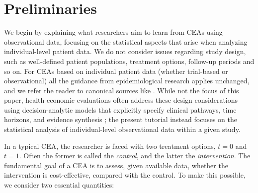 \documentclass[aoas,preprint]{imsart}
\theoremstyle{plain}
\theoremstyle{definition}
\theoremstyle{remark}
\theoremstyle{remark}
\begin{document}
\section{Preliminaries}\label{sec:preliminaries}

We begin by explaining what researchers aim to learn from CEAs using observational data, focusing on the statistical aspects that arise when analyzing individual-level patient data. We do not consider issues regarding study design, such as well-defined patient populations, treatment options, follow-up periods and so on. For CEAs based on individual patient data (whether trial-based or observational) all the guidance from epidemiological research applies unchanged, and we refer the reader to canonical sources like \citet{hernan2016using}. While not the focus of this paper, health economic evaluations often address these design considerations using decision-analytic models that explicitly specify clinical pathways, time horizons, and evidence synthesis \citep{Sculpher2006}; the present tutorial instead focuses on the statistical analysis of individual-level observational data within a given study.

In a typical CEA, the researcher is faced with two treatment options, $t = 0$ and $t = 1$. Often the former is called the \emph{control}, and the latter the \emph{intervention}. The fundamental goal of a CEA is to assess, given available data, whether the intervention is cost-effective, compared with the control. To make this possible, we consider two essential quantities:
\end{document}
